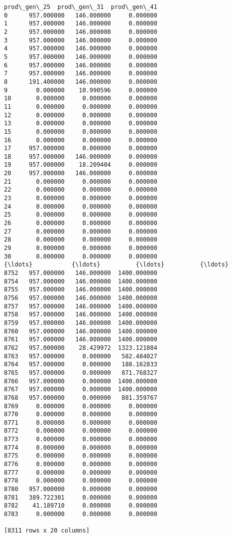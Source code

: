 \documentclass[11pt]{article}
\begin{document}
\begin{Verbatim}[commandchars=\\\{\}]
      prod\_gen\_25  prod\_gen\_31  prod\_gen\_41  
0      957.000000   146.000000     0.000000  
1      957.000000   146.000000     0.000000  
2      957.000000   146.000000     0.000000  
3      957.000000   146.000000     0.000000  
4      957.000000   146.000000     0.000000  
5      957.000000   146.000000     0.000000  
6      957.000000   146.000000     0.000000  
7      957.000000   146.000000     0.000000  
8      191.400000   146.000000     0.000000  
9        0.000000    10.990596     0.000000  
10       0.000000     0.000000     0.000000  
11       0.000000     0.000000     0.000000  
12       0.000000     0.000000     0.000000  
13       0.000000     0.000000     0.000000  
15       0.000000     0.000000     0.000000  
16       0.000000     0.000000     0.000000  
17     957.000000     0.000000     0.000000  
18     957.000000   146.000000     0.000000  
19     957.000000    18.209404     0.000000  
20     957.000000   146.000000     0.000000  
21       0.000000     0.000000     0.000000  
22       0.000000     0.000000     0.000000  
23       0.000000     0.000000     0.000000  
24       0.000000     0.000000     0.000000  
25       0.000000     0.000000     0.000000  
26       0.000000     0.000000     0.000000  
27       0.000000     0.000000     0.000000  
28       0.000000     0.000000     0.000000  
29       0.000000     0.000000     0.000000  
30       0.000000     0.000000     0.000000  
{\ldots}           {\ldots}          {\ldots}          {\ldots}  
8752   957.000000   146.000000  1400.000000  
8754   957.000000   146.000000  1400.000000  
8755   957.000000   146.000000  1400.000000  
8756   957.000000   146.000000  1400.000000  
8757   957.000000   146.000000  1400.000000  
8758   957.000000   146.000000  1400.000000  
8759   957.000000   146.000000  1400.000000  
8760   957.000000   146.000000  1400.000000  
8761   957.000000   146.000000  1400.000000  
8762   957.000000    28.429972  1323.121084  
8763   957.000000     0.000000   582.484027  
8764   957.000000     0.000000   188.162833  
8765   957.000000     0.000000   871.768327  
8766   957.000000     0.000000  1400.000000  
8767   957.000000     0.000000  1400.000000  
8768   957.000000     0.000000   881.359767  
8769     0.000000     0.000000     0.000000  
8770     0.000000     0.000000     0.000000  
8771     0.000000     0.000000     0.000000  
8772     0.000000     0.000000     0.000000  
8773     0.000000     0.000000     0.000000  
8774     0.000000     0.000000     0.000000  
8775     0.000000     0.000000     0.000000  
8776     0.000000     0.000000     0.000000  
8777     0.000000     0.000000     0.000000  
8778     0.000000     0.000000     0.000000  
8780   957.000000     0.000000     0.000000  
8781   389.722301     0.000000     0.000000  
8782    41.189710     0.000000     0.000000  
8783     0.000000     0.000000     0.000000  

[8311 rows x 20 columns]

    \end{Verbatim}
\end{document}
